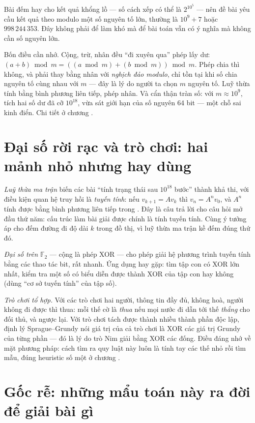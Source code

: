 \documentclass[../../algorithm.tex]{subfiles}
\begin{document}
Bài đếm hay cho kết quả khổng lồ --- số cách xếp có thể là \(2^{10^5}\) --- nên đề bài yêu cầu kết quả theo modulo một số nguyên tố lớn, thường là \(10^9+7\) hoặc \(998\,244\,353\). Đây không phải để làm khó mà để bài toán vẫn có ý nghĩa mà không cần số nguyên lớn.

Bốn điều cần nhớ. Cộng, trừ, nhân đều ``đi xuyên qua'' phép lấy dư: \((a+b) \bmod m = ((a \bmod m) + (b \bmod m)) \bmod m\). Phép chia thì không, và phải thay bằng nhân với \emph{nghịch đảo modulo}, chỉ tồn tại khi số chia nguyên tố cùng nhau với \(m\) --- đây là lý do người ta chọn \(m\) nguyên tố. Luỹ thừa tính bằng bình phương liên tiếp,  phép nhân. Và cẩn thận tràn số: với \(m \approx 10^9\), tích hai số dư đã cỡ \(10^{18}\), vừa sát giới hạn của số nguyên 64 bit --- một chỗ sai kinh điển. Chi tiết ở chương .

\section{Đại số rời rạc và trò chơi: hai mảnh nhỏ nhưng hay dùng}

\emph{Luỹ thừa ma trận} biến các bài ``tính trạng thái sau \(10^{18}\) bước'' thành khả thi, với điều kiện quan hệ truy hồi là \emph{tuyến tính}: nếu \(v_{k+1} = A v_k\) thì \(v_n = A^n v_0\), và \(A^n\) tính được bằng bình phương liên tiếp trong . Đây là câu trả lời cho câu hỏi mở đầu thứ năm: cấu trúc làm bài giải được chính là tính tuyến tính. Cùng ý tưởng áp cho đếm đường đi độ dài \(k\) trong đồ thị, vì luỹ thừa ma trận kề đếm đúng thứ đó.

\emph{Đại số trên \(\mathbb{F}_2\)} --- cộng là phép XOR --- cho phép giải hệ phương trình tuyến tính bằng các thao tác bit, rất nhanh. Ứng dụng hay gặp: tìm tập con có XOR lớn nhất, kiểm tra một số có biểu diễn được thành XOR của tập con hay không (dùng ``cơ sở tuyến tính'' của tập số).

\emph{Trò chơi tổ hợp.} Với các trò chơi hai người, thông tin đầy đủ, không hoà, người không đi được thì thua: mỗi thế cờ là \emph{thua} nếu mọi nước đi dẫn tới thế \emph{thắng} cho đối thủ, và ngược lại. Với trò chơi tách được thành nhiều thành phần độc lập, định lý Sprague--Grundy nói giá trị của cả trò chơi là XOR các giá trị Grundy của từng phần --- đó là lý do trò Nim giải bằng XOR các đống. Điều đáng nhớ về mặt phương pháp: cách tìm ra quy luật này luôn là tính tay các thế nhỏ rồi tìm mẫu, đúng heuristic số một ở chương .

\section{Gốc rễ: những mẩu toán này ra đời để giải bài gì}
\end{document}
